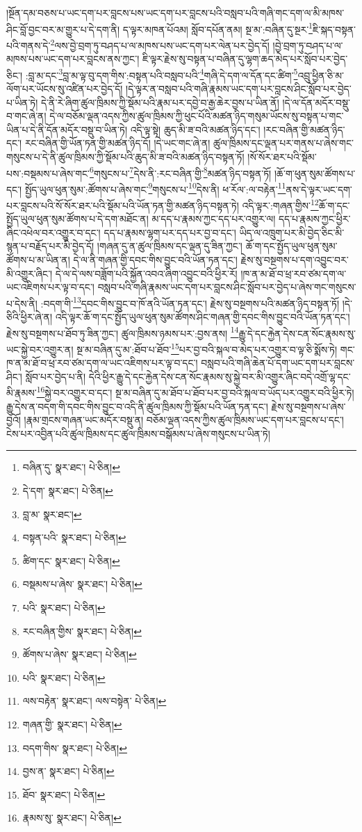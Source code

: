 །སྔོན་དམ་བཅས་པ་ཡང་དག་པར་བླངས་པས་ཡང་དག་པར་བླངས་པའི་བསླབ་པའི་གཞི་གང་དག་ལ་མི་མཁས་ཤིང་བློ་བྱང་བར་མ་གྱུར་པ་དེ་དག་ནི། ད་ལྟར་མཁན་པོའམ། སློབ་དཔོན་ནམ། སྔ་མ་:བཞིན་དུ་སྔར་\footnote{བཞིན་དུ་  སྣར་ཐང་།  པེ་ཅིན། }ཇི་སྐད་བསྟན་པའི་གནས་དེ་\footnote{དེ་དག་  སྣར་ཐང་།  པེ་ཅིན། }ལས་བྱེ་བྲག་ཏུ་བཤད་པ་ལ་མཁས་པས་ཡང་དག་པར་ལེན་པར་བྱེད་དོ། །བྱེ་བྲག་ཏུ་བཤད་པ་ལ་མཁས་པས་ཡང་དག་པར་བླངས་ནས་ཀྱང་། ཇི་ལྟར་རྗེས་སུ་བསྟན་པ་བཞིན་དུ་ལྷག་ཆད་མེད་པར་སློབ་པར་བྱེད་ཅིང་། :བླ་མ་དང་\footnote{བླ་མ་  སྣར་ཐང་། }བླ་མ་ལྟ་བུ་དག་གིས་:བསྟན་པའི་བསླབ་པའི་\footnote{བསྟན་པའི་  སྣར་ཐང་།  པེ་ཅིན། }གཞི་དེ་དག་ལ་དོན་དང་ཚིག་\footnote{ཚིག་དང་  སྣར་ཐང་།  པེ་ཅིན། }འབྲུ་ཕྱིན་ཅི་མ་ལོག་པར་ཡོངས་སུ་འཛིན་པར་བྱེད་དོ། །དེ་ལྟར་ན་བསླབ་པའི་གཞི་རྣམས་ཡང་དག་པར་བླངས་ཤིང་སློབ་པར་བྱེད་པ་ཡིན་ཏེ། དེ་ནི་རེ་ཞིག་ཚུལ་ཁྲིམས་ཀྱི་སྡོམ་པའི་རྣམ་པར་དབྱེ་བ་རྒྱ་ཆེར་བྱས་པ་ཡིན་ནོ། །དེ་ལ་དོན་མདོར་བསྡུ་བ་གང་ཞེ་ན། དེ་ལ་བཅོམ་ལྡན་འདས་ཀྱིས་ཚུལ་ཁྲིམས་ཀྱི་ཕུང་པོའི་མཚན་ཉིད་གསུམ་ཡོངས་སུ་བསྟན་པ་གང་ཡིན་པ་དེ་ནི་དོན་མདོར་བསྡུ་བ་ཡིན་ཏེ། འདི་ལྟ་སྟེ། ཆུད་མི་ཟ་བའི་མཚན་ཉིད་དང་། །རང་བཞིན་གྱི་མཚན་ཉིད་དང་། རང་བཞིན་གྱི་ཡོན་ཏན་གྱི་མཚན་ཉིད་དོ། །དེ་ཡང་གང་ཞེ་ན། ཚུལ་ཁྲིམས་དང་ལྡན་པར་གནས་པ་ཞེས་གང་གསུངས་པ་དེ་ནི་ཚུལ་ཁྲིམས་ཀྱི་སྡོམ་པའི་ཆུད་མི་ཟ་བའི་མཚན་ཉིད་བསྟན་ཏོ། །སོ་སོར་ཐར་པའི་སྡོམ་པས་:བསྡམས་པ་ཞེས་གང་\footnote{བསྡམས་པ་ཞེས་  སྣར་ཐང་།  པེ་ཅིན། }གསུངས་པ་\footnote{པའི་  སྣར་ཐང་།  པེ་ཅིན། }དེས་ནི་:རང་བཞིན་གྱི་\footnote{རང་བཞིན་གྱིས་  སྣར་ཐང་།  པེ་ཅིན། }མཚན་ཉིད་བསྟན་ཏོ། །ཆོ་ག་ཕུན་སུམ་ཚོགས་པ་དང་། སྤྱོད་ཡུལ་ཕུན་སུམ་:ཚོགས་པ་ཞེས་གང་\footnote{ཚོགས་པ་ཞེས་  སྣར་ཐང་།  པེ་ཅིན། }གསུངས་པ་\footnote{པའི་  སྣར་ཐང་།  པེ་ཅིན། }དེས་ནི། ཕ་རོལ་:ལ་བརྟེན་\footnote{ལས་བརྟེན་  སྣར་ཐང་། ལས་བསྟེན་  པེ་ཅིན། }ནས་དེ་ལྟར་ཡང་དག་པར་བླངས་པའི་སོ་སོར་ཐར་པའི་སྡོམ་པའི་ཡོན་ཏན་གྱི་མཚན་ཉིད་བསྟན་ཏེ། འདི་ལྟར་:གཞན་གྱིས་\footnote{གཞན་གྱི་  སྣར་ཐང་།  པེ་ཅིན། }ཆོ་ག་དང་སྤྱོད་ཡུལ་ཕུན་སུམ་ཚོགས་པ་དེ་དག་མཐོང་ན། མ་དད་པ་རྣམས་ཀྱང་དད་པར་འགྱུར་ལ། དད་པ་རྣམས་ཀྱང་ཕྱིར་ཞིང་འཕེལ་བར་འགྱུར་བ་དང་། དད་པ་རྣམས་ལྷག་པར་དད་པར་བྱ་བ་དང་། ཡིད་ལ་འཁྲུག་པར་མི་བྱེད་ཅིང་མི་སྙན་པ་བརྗོད་པར་མི་བྱེད་དོ། །གཞན་དུ་ན་ཚུལ་ཁྲིམས་དང་ལྡན་དུ་ཟིན་ཀྱང་། ཆོ་ག་དང་སྤྱོད་ཡུལ་ཕུན་སུམ་ཚོགས་པ་མ་ཡིན་ན། དེ་ལ་ནི་གཞན་གྱི་དབང་གིས་བྱུང་བའི་ཡོན་ཏན་དང་། རྗེས་སུ་བསྔགས་པ་དག་འབྱུང་བར་མི་འགྱུར་ཞིང་། དེ་ལ་དེ་ལས་བཟློག་པའི་སྐྱོན་འབའ་ཞིག་འབྱུང་བའི་ཕྱིར་རོ། །ཁ་ན་མ་ཐོ་བ་ཕྲ་རབ་ཙམ་དག་ལ་ཡང་འཇིགས་པར་ལྟ་བ་དང་། བསླབ་པའི་གཞི་རྣམས་ཡང་དག་པར་བླངས་ཤིང་སློབ་པར་བྱེད་པ་ཞེས་གང་གསུངས་པ་དེས་ནི། :བདག་གི་\footnote{བདག་གིས་  སྣར་ཐང་།  པེ་ཅིན། }དབང་གིས་བྱུང་བ་ཁོ་ནའི་ཡོན་ཏན་དང་། རྗེས་སུ་བསྔགས་པའི་མཚན་ཉིད་བསྟན་ཏོ། །དེ་ཅིའི་ཕྱིར་ཞེ་ན། འདི་ལྟར་ཆོ་ག་དང་སྤྱོད་ཡུལ་ཕུན་སུམ་ཚོགས་ཤིང་གཞན་གྱི་དབང་གིས་བྱུང་བའི་ཡོན་ཏན་དང་། རྗེས་སུ་བསྔགས་པ་ཐོབ་ཏུ་ཟིན་ཀྱང་། ཚུལ་ཁྲིམས་ཉམས་པར་:བྱས་ནས། \footnote{བྱས་ན་  སྣར་ཐང་།  པེ་ཅིན། }རྒྱུ་དེ་དང་རྐྱེན་དེས་ངན་སོང་རྣམས་སུ་ཡང་སྐྱེ་བར་འགྱུར་ན། སྔ་མ་བཞིན་དུ་མ་:ཐོབ་པ་ཐོབ་\footnote{ཐོབ་  སྣར་ཐང་།  པེ་ཅིན། }པར་བྱ་བའི་སྐལ་བ་མེད་པར་འགྱུར་བ་ལྟ་ཅི་སྨོས་ཏེ། གང་ཁ་ན་མ་ཐོ་བ་ཕྲ་རབ་ཙམ་དག་ལ་ཡང་འཇིགས་པར་ལྟ་བ་དང་། བསླབ་པའི་གཞི་ཆེན་པོ་དག་ཡང་དག་པར་བླངས་ཤིང་། སློབ་པར་བྱེད་པ་ནི། དེའི་ཕྱིར་རྒྱུ་དེ་དང་རྐྱེན་དེས་ངན་སོང་རྣམས་སུ་སྐྱེ་བར་མི་འགྱུར་ཞིང་བདེ་འགྲོ་ལྷ་དང་མི་རྣམས་\footnote{རྣམས་སུ་  སྣར་ཐང་།  པེ་ཅིན། }སྐྱེ་བར་འགྱུར་བ་དང་། སྔ་མ་བཞིན་དུ་མ་ཐོབ་པ་ཐོབ་པར་བྱ་བའི་སྐལ་བ་ཡོད་པར་འགྱུར་བའི་ཕྱིར་ཏེ། རྒྱུ་དེས་ན་བདག་གི་དབང་གིས་བྱུང་བ་འདི་ནི་ཚུལ་ཁྲིམས་ཀྱི་སྡོམ་པའི་ཡོན་ཏན་དང་། རྗེས་སུ་བསྔགས་པ་ཞེས་བྱའོ། །རྣམ་གྲངས་གཞན་ཡང་མདོར་བསྡུ་ན། བཅོམ་ལྡན་འདས་ཀྱིས་ཚུལ་ཁྲིམས་ཡང་དག་པར་བླངས་པ་དང་། ངེས་པར་འབྱིན་པའི་ཚུལ་ཁྲིམས་དང་ཚུལ་ཁྲིམས་བསྒོམས་པ་ཞེས་གསུངས་པ་ཡིན་ཏེ། 